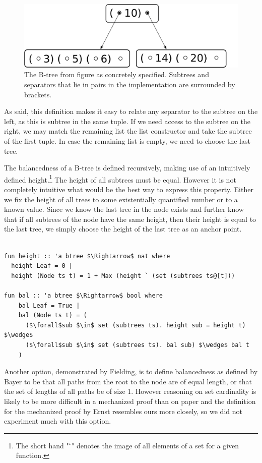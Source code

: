 \begin{figure}
    \centering
    \includegraphics[width=0.5\linewidth]{figures/btree-basic.pdf}
    \caption[Visualization of the implementation choice for B-Trees]
    {The B-tree from figure  as concretely specified.
    Subtrees and separators that lie in pairs in the implementation are surrounded by brackets.}
    \label{fig:btree-basic}
\end{figure}


As said, this definition makes it easy to relate any separator
to the subtree on the left, as this is subtree in the same tuple.
If we need access to the subtree on the right,
we may match the remaining list the list constructor
and take the subtree of the first tuple.
In case the remaining list is empty,
we need to choose the last tree.

The balancedness of a B-tree is defined recursively, making use
of an intuitively defined height.\footnote{
    The short hand "$`$" denotes the image of all elements of a set for a given function.
}
The height of all subtrees must be equal.
However it is not completely intuitive
what would be the best way to express this property.
Either we fix the height of all trees
to some existentially quantified number or to a known value.
Since we know the last tree in the node exists and further
know that if all subtrees of the node have the same height,
then their height is equal to the last tree,
we simply choose the height of the last tree as an anchor point.


\begin{lstlisting}[mathescape=true, language=Isabelle]

fun height :: 'a btree $\Rightarrow$ nat where
  height Leaf = 0 |
  height (Node ts t) = 1 + Max (height ` (set (subtrees ts@[t]))

fun bal :: 'a btree $\Rightarrow$ bool where
    bal Leaf = True |
    bal (Node ts t) = (
      ($\forall$sub $\in$ set (subtrees ts). height sub = height t) $\wedge$
      ($\forall$sub $\in$ set (subtrees ts). bal sub) $\wedge$ bal t
    )
\end{lstlisting}

Another option, demonstrated by Fielding, is
to define balancedness as defined by Bayer
to be that all paths from the root to the node are of equal length,
or that the set of lengths of all paths be of size 1.
However reasoning on set cardinality is likely to be more difficult
in a mechanized proof than on paper
and the definition for the mechanized proof by Ernst resembles
ours more closely, so we did not experiment much with this option.

